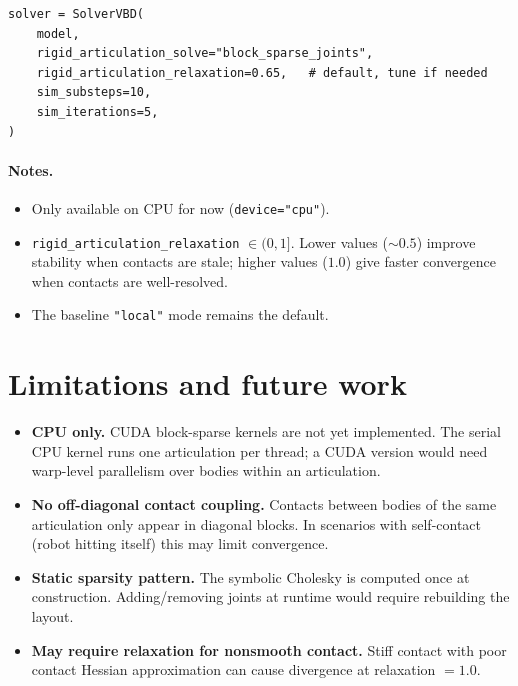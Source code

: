 \documentclass[11pt,a4paper]{article}
\begin{document}
\begin{lstlisting}
solver = SolverVBD(
    model,
    rigid_articulation_solve="block_sparse_joints",
    rigid_articulation_relaxation=0.65,   # default, tune if needed
    sim_substeps=10,
    sim_iterations=5,
)
\end{lstlisting}

\paragraph{Notes.}
\begin{itemize}[nosep]
  \item Only available on CPU for now (\texttt{device="cpu"}).
  \item \texttt{rigid\_articulation\_relaxation} $\in (0, 1]$. Lower values
        ($\sim 0.5$) improve stability when contacts are stale; higher values
        ($1.0$) give faster convergence when contacts are well-resolved.
  \item The baseline \texttt{"local"} mode remains the default.
\end{itemize}

\section{Limitations and future work}

\begin{itemize}
  \item \textbf{CPU only.}  CUDA block-sparse kernels are not yet implemented.
        The serial CPU kernel runs one articulation per thread; a CUDA version
        would need warp-level parallelism over bodies within an articulation.
  \item \textbf{No off-diagonal contact coupling.}  Contacts between bodies of
        the same articulation only appear in diagonal blocks.  In scenarios with
        self-contact (robot hitting itself) this may limit convergence.
  \item \textbf{Static sparsity pattern.}  The symbolic Cholesky is computed
        once at construction.  Adding/removing joints at runtime would require
        rebuilding the layout.
  \item \textbf{May require relaxation for nonsmooth contact.}  Stiff contact
        with poor contact Hessian approximation can cause divergence at
        relaxation $= 1.0$.
\end{itemize}
\end{document}
